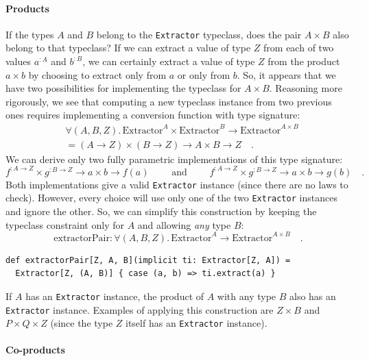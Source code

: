 \paragraph{Products}

If the types $A$ and $B$ belong to the \lstinline!Extractor! typeclass,
does the pair $A\times B$ also belong to that typeclass? If we can
extract a value of type $Z$ from each of two values $a^{:A}$ and
$b^{:B}$, we can certainly extract a value of type $Z$ from the
product $a\times b$ by choosing to extract only from $a$ or only
from $b$. So, it appears that we have two possibilities for implementing
the typeclass for $A\times B$. Reasoning more rigorously, we see
that computing a new typeclass instance from two previous ones requires
implementing a conversion function with type signature:
\begin{align*}
 & \forall(A,B,Z).\,\text{Extractor}^{A}\times\text{Extractor}^{B}\rightarrow\text{Extractor}^{A\times B}\\
 & =\left(A\rightarrow Z\right)\times\left(B\rightarrow Z\right)\rightarrow A\times B\rightarrow Z\quad.
\end{align*}
We can derive only two fully parametric implementations of this type
signature: 
\[
f^{:A\rightarrow Z}\times g^{:B\rightarrow Z}\rightarrow a\times b\rightarrow f(a)\quad\quad\text{ and }\quad\quad f^{:A\rightarrow Z}\times g^{:B\rightarrow Z}\rightarrow a\times b\rightarrow g(b)\quad.
\]
Both implementations give a valid \lstinline!Extractor! instance
(since there are no laws to check). However, every choice will use
only one of the two \lstinline!Extractor! instances and ignore the
other. So, we can simplify this construction by keeping the typeclass
constraint only for $A$ and allowing \emph{any} type $B$:
\[
\text{extractorPair}:\forall(A,B,Z).\,\text{Extractor}^{A}\rightarrow\text{Extractor}^{A\times B}\quad.
\]
\begin{lstlisting}
def extractorPair[Z, A, B](implicit ti: Extractor[Z, A]) =
  Extractor[Z, (A, B)] { case (a, b) => ti.extract(a) }
\end{lstlisting}
If $A$ has an \lstinline!Extractor! instance, the product of $A$
with any type $B$ also has an \lstinline!Extractor! instance. Examples
of applying this construction are $Z\times B$ and $P\times Q\times Z$
(since the type $Z$ itself has an \lstinline!Extractor! instance).

\paragraph{Co-products}

